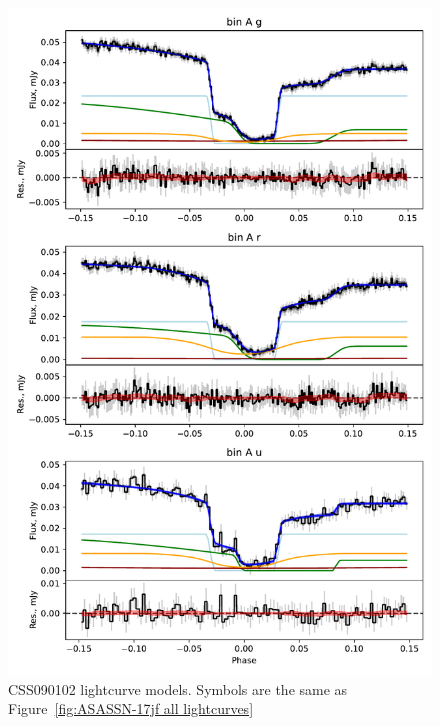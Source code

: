 \begin{figure}
    \centering
    \includegraphics[width=\textwidth]{figures/results/CSS090102/CSS090102_1.pdf}
    \caption{CSS090102 lightcurve models. Symbols are the same as Figure~\ref{fig:ASASSN-17jf all lightcurves}}
    \label{fig:CSS090102 all lightcurves}
\end{figure}
